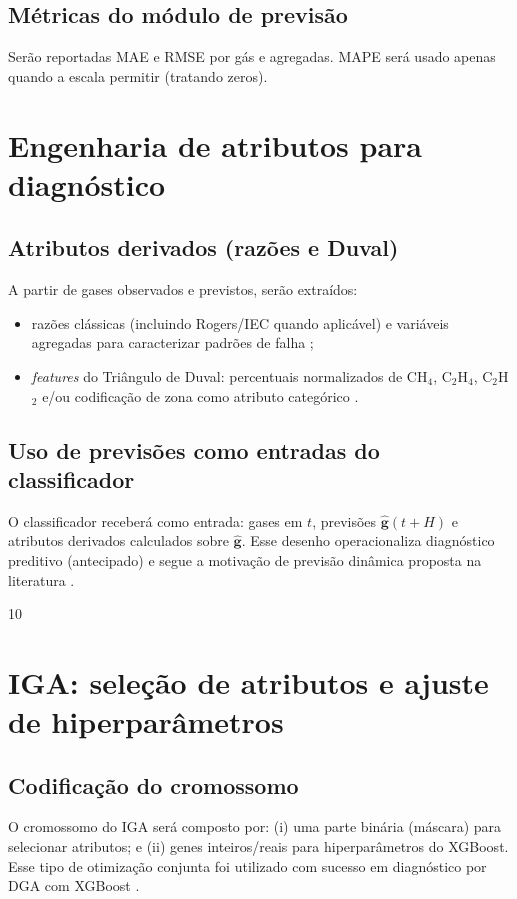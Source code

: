 \subsection{Métricas do módulo de previsão}
Serão reportadas MAE e RMSE por gás e agregadas.
MAPE será usado apenas quando a escala permitir (tratando zeros).

\section{Engenharia de atributos para diagnóstico}
\subsection{Atributos derivados (razões e Duval)}
A partir de gases observados e previstos, serão extraídos:
\begin{itemize}
\item razões clássicas (incluindo Rogers/IEC quando aplicável) e
variáveis agregadas para caracterizar padrões de falha
\cite{iec60599_2022,ieee_c57_104_2019,nanfak2024_traditional_dga_review};
\item \textit{features} do
Triângulo de Duval: percentuais normalizados de CH$_4$, C$_2$H$_4$,
C$_2$H$_2$ e/ou codificação de zona como atributo categórico
\cite{duval2002_review,cigre_tb771_2019}.
\end{itemize}

\subsection{Uso de previsões como entradas do classificador}
O classificador receberá como entrada:
gases em $t$, previsões $\hat{\mathbf{g}}(t+H)$ e atributos derivados
calculados sobre $\hat{\mathbf{g}}$.
Esse desenho operacionaliza diagnóstico preditivo (antecipado) e segue a
motivação de previsão dinâmica proposta na literatura
\cite{wang2023_lstm_dga}.

10\section{IGA: seleção de atributos e ajuste de hiperparâmetros}
\subsection{Codificação do cromossomo}
O cromossomo do IGA será composto por:
(i) uma parte binária (máscara) para selecionar atributos; e
(ii) genes inteiros/reais para hiperparâmetros do XGBoost.
Esse tipo de otimização conjunta foi utilizado com sucesso em
diagnóstico por DGA com XGBoost \cite{wu2021_iga_xgboost}.

